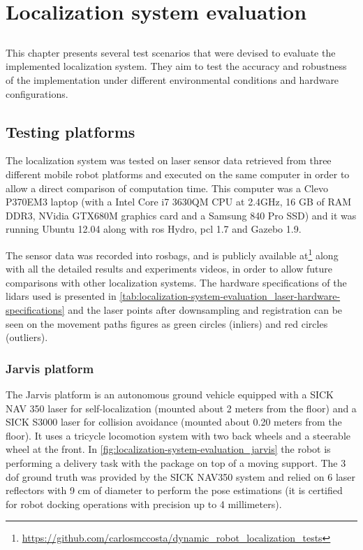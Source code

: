 \chapter{Localization system evaluation} \label{chap:localization-system-evaluation}



\section*{}

This chapter presents several test scenarios that were devised to evaluate the implemented localization system. They aim to test the accuracy and robustness of the implementation under different environmental conditions and hardware configurations.



\section{Testing platforms}

The localization system was tested on laser sensor data retrieved from three different mobile robot platforms and executed on the same computer in order to allow a direct comparison of computation time. This computer was a Clevo P370EM3 laptop (with a Intel Core i7 3630QM CPU at 2.4GHz, 16 GB of RAM DDR3, NVidia GTX680M graphics card and a Samsung 840 Pro SSD) and it was running Ubuntu 12.04 along with \gls{ros} Hydro, \gls{pcl} 1.7 and Gazebo 1.9.

The sensor data was recorded into rosbags, and is publicly available at\footnote{\url{https://github.com/carlosmccosta/dynamic_robot_localization_tests}} along with all the detailed results and experiments videos, in order to allow future comparisons with other localization systems. The hardware specifications of the \glspl{lidar} used is presented in \cref{tab:localization-system-evaluation_laser-hardware-specifications} and the laser points after downsampling and registration can be seen on the movement paths figures as green circles (inliers) and red circles (outliers).


\subsection{Jarvis platform}

The Jarvis platform is an autonomous ground vehicle equipped with a SICK NAV 350 laser for self-localization (mounted about 2 meters from the floor) and a SICK S3000 laser for collision avoidance (mounted about 0.20 meters from the floor). It uses a tricycle locomotion system with two back wheels and a steerable wheel at the front. In \cref{fig:localization-system-evaluation_jarvis} the robot is performing a delivery task with the package on top of a moving support. The 3 \gls{dof} ground truth was provided by the SICK NAV350 system and relied on 6 laser reflectors with 9 cm of diameter to perform the pose estimations (it is certified for robot docking operations with precision up to 4 millimeters).

